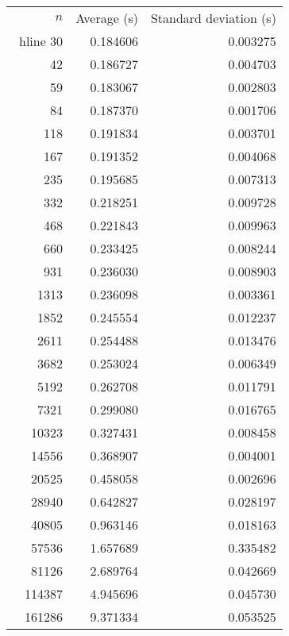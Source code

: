\begin{tabular}{rrr}
$n$& Average (s) & Standard deviation (s)\\\ hline
30& 0.184606& 0.003275\\
42& 0.186727& 0.004703\\
59& 0.183067& 0.002803\\
84& 0.187370& 0.001706\\
118& 0.191834& 0.003701\\
167& 0.191352& 0.004068\\
235& 0.195685& 0.007313\\
332& 0.218251& 0.009728\\
468& 0.221843& 0.009963\\
660& 0.233425& 0.008244\\
931& 0.236030& 0.008903\\
1313& 0.236098& 0.003361\\
1852& 0.245554& 0.012237\\
2611& 0.254488& 0.013476\\
3682& 0.253024& 0.006349\\
5192& 0.262708& 0.011791\\
7321& 0.299080& 0.016765\\
10323& 0.327431& 0.008458\\
14556& 0.368907& 0.004001\\
20525& 0.458058& 0.002696\\
28940& 0.642827& 0.028197\\
40805& 0.963146& 0.018163\\
57536& 1.657689& 0.335482\\
81126& 2.689764& 0.042669\\
114387& 4.945696& 0.045730\\
161286& 9.371334& 0.053525\\
\end{tabular}
